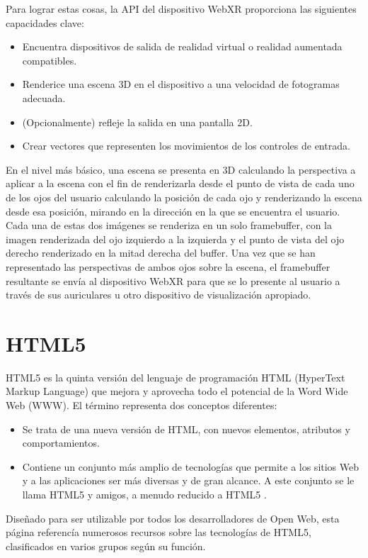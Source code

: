 \documentclass[a4paper, 12pt]{book}
\begin{document}
Para lograr estas cosas, la API del dispositivo WebXR proporciona las siguientes capacidades clave:

\begin{itemize}
    \item Encuentra dispositivos de salida de realidad virtual o realidad aumentada compatibles.
    \item Renderice una escena 3D en el dispositivo a una velocidad de fotogramas adecuada.
    \item (Opcionalmente) refleje la salida en una pantalla 2D. 
    \item Crear vectores que representen los movimientos de los controles de entrada.

\end{itemize}
En el nivel más básico, una escena se presenta en 3D calculando la perspectiva a aplicar a la escena con el fin de renderizarla desde el punto de vista de cada uno de los ojos del usuario calculando la posición de cada ojo y renderizando la escena desde esa posición, mirando en la dirección en la que se encuentra el usuario. Cada una de estas dos imágenes se renderiza en un solo framebuffer, con la imagen renderizada del ojo izquierdo a la izquierda y el punto de vista del ojo derecho renderizado en la mitad derecha del buffer. Una vez que se han representado las perspectivas de ambos ojos sobre la escena, el framebuffer resultante se envía al dispositivo WebXR para que se lo presente al usuario a través de sus auriculares u otro dispositivo de visualización apropiado.

\section{HTML5} 
\label{sec:HTML5}

HTML5 es la quinta versión del lenguaje de programación HTML (HyperText Markup Language) que mejora y aprovecha todo el potencial de la Word Wide Web (WWW).
El término representa dos conceptos diferentes:
\begin{itemize}
    \item Se trata de una nueva versión de HTML, con nuevos elementos, atributos y comportamientos.
    \item Contiene un conjunto más amplio de tecnologías que permite a los sitios Web y a las aplicaciones ser más diversas y de gran alcance. A este conjunto se le llama HTML5 y amigos, a menudo reducido a HTML5 .
\end{itemize}
Diseñado para ser utilizable por todos los desarrolladores de Open Web, esta página referencía numerosos recursos sobre las tecnologías de HTML5, clasificados en varios grupos según su función.
\end{document}
